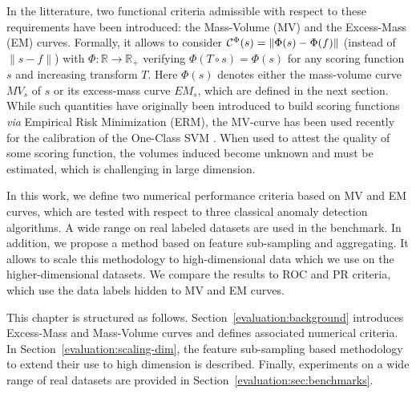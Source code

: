 In the litterature, two functional criteria admissible with respect to these requirements have been introduced: the Mass-Volume (MV) \cite{CLEM13,CLEM14} and the Excess-Mass (EM) \cite{AISTAT15} curves.
Formally, it allows to consider $\mathcal{C}^{\Phi}(s) = \| \Phi(s) - \Phi(f) \|$ (instead of $\|s - f\|$) %
with $\Phi: \mathbb{R} \to \mathbb{R}_+$ verifying $\Phi(T \circ s) = \Phi(s)$ 
for any scoring function $s$ and increasing transform $T$. Here $\Phi(s)$ denotes either the mass-volume curve $MV_s$ of $s$ or its excess-mass curve $EM_s$, which are defined in the next section.  
While such quantities have originally been introduced to build scoring functions \emph{via}
Empirical Risk Minimization (ERM), the MV-curve has been used recently for the calibration of the One-Class SVM \cite{Thomas2015}.
When used to attest the quality of some scoring function, the volumes induced become unknown and must be estimated, which is challenging in large dimension.

In this work, we define two numerical performance criteria based on MV and EM curves, which are tested with respect to three classical anomaly detection algorithms. A wide range on real labeled datasets are used in the benchmark. In addition, we propose a method based on feature sub-sampling and aggregating. It allows to scale %
 this methodology to high-dimensional data which we use on the higher-dimensional datasets. We compare the results to ROC and PR criteria, which use the data labels hidden to MV and EM curves. 

 This chapter is structured as follows. Section~\ref{evaluation:background} introduces Excess-Mass and Mass-Volume curves and defines associated numerical criteria. In Section~\ref{evaluation:scaling-dim}, the feature sub-sampling based methodology to extend their use to high dimension is described. Finally, experiments on a wide range of real datasets are provided in Section~\ref{evaluation:sec:benchmarks}.


